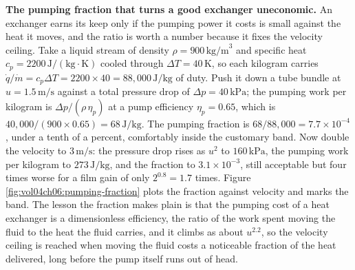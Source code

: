 \textbf{The pumping fraction that turns a good exchanger uneconomic.} An exchanger
earns its keep only if the pumping power it costs is small against the heat it
moves, and the ratio is worth a number because it fixes the velocity ceiling. Take
a liquid stream of density $\rho = 900\,\text{kg/m}^3$ and specific heat
$c_p = 2200\,\text{J}/(\text{kg}\cdot\si{\kelvin})$ cooled through $\Delta T =
40\,\si{\kelvin}$, so each kilogram carries $\dot{q}/\dot{m} = c_p\Delta T =
2200\times 40 = 88{,}000\,\text{J/kg}$ of duty. Push it down a tube bundle at
$u = 1.5\,\text{m/s}$ against a total pressure drop of $\Delta p = 40\,\text{kPa}$;
the pumping work per kilogram is $\Delta p/(\rho\,\eta_p)$ at a pump efficiency
$\eta_p = 0.65$, which is $40{,}000/(900\times 0.65) = 68\,\text{J/kg}$. The
pumping fraction is $68/88{,}000 = 7.7\times 10^{-4}$, under a tenth of a percent,
comfortably inside the customary band. Now double the velocity to $3\,\text{m/s}$:
the pressure drop rises as $u^2$ to $160\,\text{kPa}$, the pumping work per
kilogram to $273\,\text{J/kg}$, and the fraction to $3.1\times 10^{-3}$, still
acceptable but four times worse for a film gain of only $2^{0.8} = 1.7$ times.
Figure \ref{fig:vol04ch06:pumping-fraction} plots the fraction against velocity
and marks the band. The lesson the fraction makes plain is that the pumping cost of
a heat exchanger is a dimensionless efficiency, the ratio of the work spent moving
the fluid to the heat the fluid carries, and it climbs as about $u^{2.2}$, so the
velocity ceiling is reached when moving the fluid costs a noticeable fraction of
the heat delivered, long before the pump itself runs out of head.






